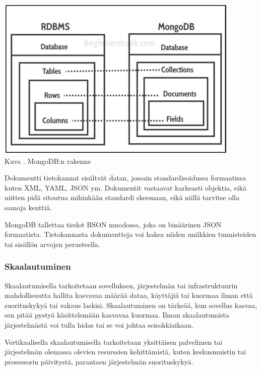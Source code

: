 \bigskip
\includegraphics{src/public/oppar/mongodb-structure.jpg} \\
Kuva \getImgCount. MongoDB:n rakenne
\medskip


Dokumentti tietokannat sisältvät datan, jossain standardisoidussa formaatissa kuten XML, YAML, JSON ym.
Dokumentit vastaavat karkeasti objektia, eikä niitten pidä sitoutua mihinkään standardi skeemaan, 
eikä niillä tarvitse olla samoja kenttiä.
\medskip


MongoDB tallettaa tiedot BSON muodossa, joka on binäärinen JSON formaatista.
Tietokannasta dokumentteja voi hakea niiden uniikkien tunnisteiden tai sisällön arvojen perusteella.
\medskip






\subsubsection{Skaalautuminen}




Skaalautumisella tarkoitetaan sovelluksen, järjestelmän tai infrastruktuurin
mahdollisuutta hallita kasvavaa määrää dataa, käyttäjiä tai kuormaa ilman että suorituskykyä tai vakaus laskisi.
Skaalautuminen on tärkeää, kun sovellus kasvaa, sen pitää pystyä käsittelemään kasvavaa kuormaa.
Ilman skaalautumista järjestelmästä voi tulla hidas tai se voi johtaa seisokkiaikaan.
\medskip

Vertikaalisella skaalautumisella tarkoitetaan yksittäisen palvelimen tai järjestelmän olemassa olevien resurssien kehittämistä, 
kuten keskusmuistin tai prosessorin päivitystä, parantaen järjestelmän suorituskykyä.
\medskip

